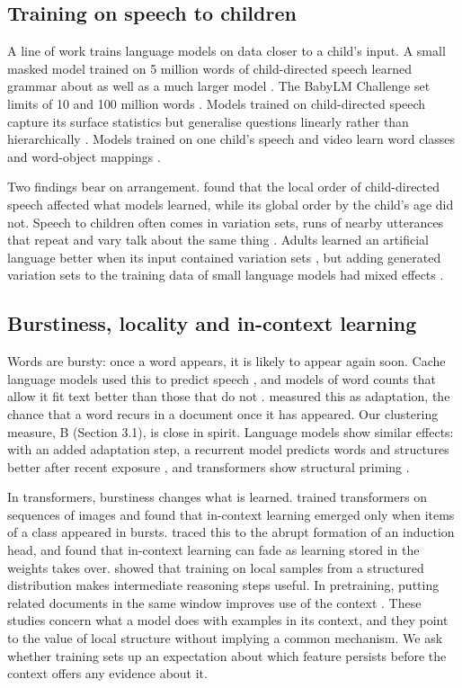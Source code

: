 \subsection{Training on speech to children}
A line of work trains language models on data closer to a child's input. A small masked model trained on 5 million words of child-directed speech learned grammar about as well as a much larger model \cite{huebner2021}. The BabyLM Challenge set limits of 10 and 100 million words \cite{warstadt2023,hu2024}. Models trained on child-directed speech capture its surface statistics but generalise questions linearly rather than hierarchically \cite{yedetore2023}. Models trained on one child's speech and video learn word classes and word-object mappings \cite{wang2023,vong2024}.

Two findings bear on arrangement. \citet{feng2024} found that the local order of child-directed speech affected what models learned, while its global order by the child's age did not. Speech to children often comes in variation sets, runs of nearby utterances that repeat and vary talk about the same thing \cite{kuntay1996}. Adults learned an artificial language better when its input contained variation sets \cite{onnis2008}, but adding generated variation sets to the training data of small language models had mixed effects \cite{haga2024}.

\subsection{Burstiness, locality and in-context learning}
Words are bursty: once a word appears, it is likely to appear again soon. Cache language models used this to predict speech \cite{kuhn1990}, and models of word counts that allow it fit text better than those that do not \cite{church1995,madsen2005}. \citet{church2000} measured this as adaptation, the chance that a word recurs in a document once it has appeared. Our clustering measure, B (Section 3.1), is close in spirit. Language models show similar effects: with an added adaptation step, a recurrent model predicts words and structures better after recent exposure \cite{vanschijndel2018}, and transformers show structural priming \cite{sinclair2022}.

In transformers, burstiness changes what is learned. \citet{chan2022} trained transformers on sequences of images and found that in-context learning emerged only when items of a class appeared in bursts. \citet{reddy2024} traced this to the abrupt formation of an induction head, and \citet{singh2023} found that in-context learning can fade as learning stored in the weights takes over. \citet{prystawski2023} showed that training on local samples from a structured distribution makes intermediate reasoning steps useful. In pretraining, putting related documents in the same window improves use of the context \cite{shi2024,zhao2024}. These studies concern what a model does with examples in its context, and they point to the value of local structure without implying a common mechanism. We ask whether training sets up an expectation about which feature persists before the context offers any evidence about it.

